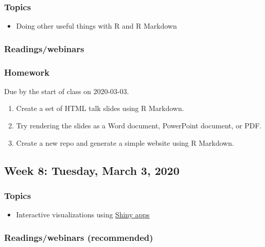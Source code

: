 \documentclass[
]{article}
\providecommand{\tightlist}{%
  \setlength{\itemsep}{0pt}\setlength{\parskip}{0pt}}
\begin{document}
\hypertarget{topics-6}{%
\subsubsection{Topics}\label{topics-6}}

\begin{itemize}
\tightlist
\item
  Doing other useful things with R and R Markdown
\end{itemize}

\hypertarget{readingswebinars-5}{%
\subsubsection{Readings/webinars}\label{readingswebinars-5}}

\hypertarget{homework-6}{%
\subsubsection{Homework}\label{homework-6}}

Due by the start of class on 2020-03-03.

\begin{enumerate}
\def\labelenumi{\arabic{enumi}.}
\tightlist
\item
  Create a set of HTML talk slides using R Markdown.
\item
  Try rendering the slides as a Word document, PowerPoint document, or
  PDF.
\item
  Create a new repo and generate a simple website using R Markdown.
\end{enumerate}

\hypertarget{week-8-tuesday-march-3-2020}{%
\subsection{Week 8: Tuesday, March 3,
2020}\label{week-8-tuesday-march-3-2020}}

\hypertarget{topics-7}{%
\subsubsection{Topics}\label{topics-7}}

\begin{itemize}
\tightlist
\item
  Interactive visualizations using \href{shiny.html}{Shiny apps}
\end{itemize}

\hypertarget{readingswebinars-recommended}{%
\subsubsection{Readings/webinars
(recommended)}\label{readingswebinars-recommended}}
\end{document}
